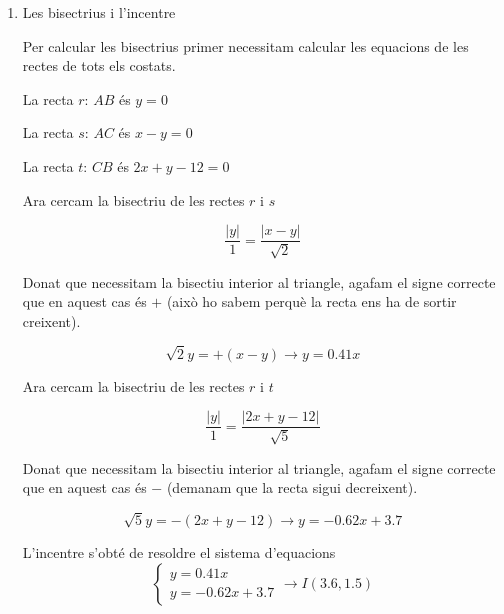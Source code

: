 \documentclass{book}
\begin{document}
\begin{mylist}
\begin{enumerate}
\begin{bluebox}
		\begin{center}
	\end{center}
	\end{bluebox}



\item Les bisectrius i l'incentre

\begin{bluebox}
Per calcular les bisectrius primer necessitam calcular les equacions de les rectes de tots els costats.

La recta $r$:  $AB$ és $y=0$

La recta $s$: $AC$ és $x-y=0$

La recta $t$: $CB$ és $2x+y-12=0$

Ara cercam la bisectriu de les rectes $r$ i $s$
	
 \[ \dfrac{|y|}{1}=\dfrac{|x-y|}{\sqrt{2}} \]
 
 Donat que necessitam la bisectiu interior al triangle, agafam el signe correcte que en aquest cas és $+$ (això ho sabem perquè la recta ens ha de sortir creixent).
 
 \[ \sqrt{2} y= +(x-y) \rightarrow  y=0.41x \]
 
	
Ara cercam la bisectriu de les rectes $r$ i $t$

\[ \dfrac{|y|}{1}=\dfrac{|2x+y-12|}{\sqrt{5}} \]

Donat que necessitam la bisectiu interior al triangle, agafam el signe correcte que en aquest cas és $-$ (demanam que la recta sigui decreixent).

\[ \sqrt{5} y= -(2x+y-12) \rightarrow  y=-0.62x+3.7 \]


	
	
	L'incentre s'obté de resoldre el sistema d'equacions
	\[ \left\{\begin{array}{l} y=0.41x  \\y=-0.62x+3.7  \end{array} \right. \rightarrow  I(3.6, 1.5)   \]
	

\end{bluebox}
\end{enumerate}
\end{mylist}
\end{document}
